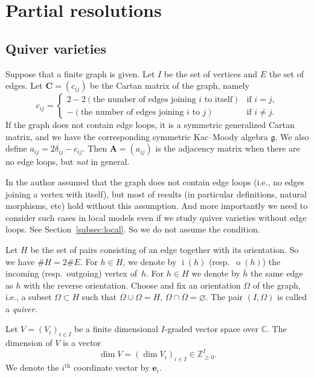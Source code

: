 \documentclass[10pt,a4paper]{amsart}
\theoremstyle{definition}
\numberwithin{equation}{section}
\newcommand{\subsecref}[1]{Section~\ref{#1}}
\newcommand{\C}{{\mathbb C}}
\newcommand{\g}{{\mathfrak g}}
\newcommand{\vin}[1]{\operatorname{i}(#1)} %
\newcommand{\vout}[1]{\operatorname{o}(#1)} %
\newcommand{\bC}{{\mathbf C}} %
\newcommand{\bA}{{\mathbf A}} %
\newcommand{\be}{{\mathbf e}}
\begin{document}
\section{Partial resolutions}\label{sec:partial}

\subsection{Quiver varieties}\label{subsec:quiver}

Suppose that a f\/inite graph is given. Let $I$ be the set of vertices
and $E$ the set of edges.
%
Let $\bC = (c_{ij})$ be the Cartan matrix of the graph, namely
\begin{equation*}
   c_{ij} =
   \begin{cases}
     2 - 2 (\text{the number of edges joining $i$ to itself})
     & \text{if $i=j$},
\\
     - (\text{the number of edges joining $i$ to $j$})
     & \text{if $i\neq j$}.
   \end{cases}
\end{equation*}
If the graph does not contain edge loops, it is a symmetric
generalized Cartan matrix, and we have the corresponding symmetric
Kac--Moody algebra $\g$. We also def\/ine
\(
   a_{ij} = 2\delta_{ij} - c_{ij}.
\)
Then $\bA = (a_{ij})$ is the adjacency matrix when there are no edge
loops, but {\it not} in general.

In \cite{Na-quiver,Na-alg} the author assumed that the graph does not
contain edge loops (i.e., no edges joining a vertex with itself), but
most of results (in particular def\/initions, natural morphisms, etc)
hold without this assumption. And more importantly we need to consider
such cases in local models even if we study quiver varieties without
edge loops. See \subsecref{subsec:local}. So we do not assume the
condition.

Let $H$ be the set of pairs consisting of an edge together with its
orientation. So we have $\# H = 2\# E$.
%
For $h\in H$, we denote by $\vin{h}$ (resp.\ $\vout{h}$) the incoming
(resp.\ outgoing) vertex of~$h$.  For $h\in H$ we denote by $\overline
h$ the same edge as $h$ with the reverse orientation.
%
Choose and f\/ix an orientation $\Omega$ of the graph,
i.e., a subset $\Omega\subset H$ such that
$\overline\Omega\cup\Omega = H$, $\Omega\cap\overline\Omega = \varnothing$.
%
The pair $(I,\Omega)$ is called a {\it quiver}.


Let $V = (V_i)_{i\in I}$ be a f\/inite dimensional $I$-graded vector
space over $\C$. The dimension of $V$ is a vector
\[
  \dim V = (\dim V_i)_{i\in I}\in \mathbb Z_{\ge 0}^I.
\]
We denote the $i^{\mathrm{th}}$ coordinate vector by $\be_i$.
\end{document}
